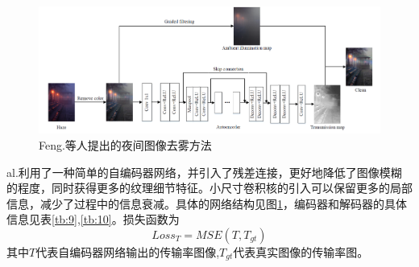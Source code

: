 \begin{figure}[H]
\centering
\includegraphics[width=1.0\linewidth]{pics/screenshot002}
\caption{Feng.等人提出的夜间图像去雾方法}
\label{fig:screenshot002}
\end{figure}
\begin{multicols}{2}
\noindent al.\cite{17}利用了一种简单的自编码器网络，并引入了残差连接，更好地降低了图像模糊的程度，同时获得更多的纹理细节特征。小尺寸卷积核的引入可以保留更多的局部信息，减少了过程中的信息衰减。具体的网络结构见图\ref{fig:screenshot002}，编码器和解码器的具体信息见表\ref{tb:9},\ref{tb:10}。损失函数为
\begin{equation}
	Loss_T=MSE(T,T_{gt})
\end{equation}
其中$T$代表自编码器网络输出的传输率图像,$T_{gt}$代表真实图像的传输率图。



\end{multicols}
